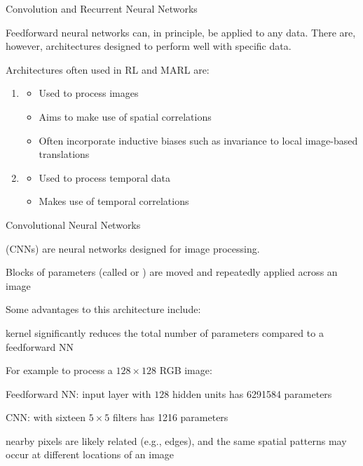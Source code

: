 \begin{frame}[t]{Convolution and Recurrent Neural Networks }

Feedforward neural networks can, in principle, be applied to any data. There are, however, architectures designed to perform well with specific data.

Architectures often used in RL and MARL are:

\begin{enumerate}
    \item {}
    \begin{itemize}
        \item Used to process images
        \item Aims to make use of spatial correlations
        \item Often incorporate inductive biases such as invariance to local image-based translations
    \end{itemize}
        \item {}
    \begin{itemize}
        \item Used to process temporal data 
        \item Makes use of temporal correlations
    \end{itemize}
\end{enumerate}
    
\end{frame}

\begin{frame}[t]{Convolutional Neural Networks}

     (CNNs) are neural networks designed for image processing.
    \blist
        \item Blocks of parameters (called  or ) are moved and repeatedly applied across an image
    \elist

    Some advantages to this architecture include:

    \blist
        \item {} kernel significantly reduces the total number of parameters compared to a feedforward NN
        \item For example to process a $128 \times 128$ RGB image:
            \vspace{5pt}
        \blist
            \item Feedforward NN: input layer with $128$ hidden units has \num{6291584} parameters
            \item CNN: with sixteen $5\times5$ filters has \num{1216} parameters
        \elist
        \item {} nearby pixels are likely related (e.g., edges), and the same spatial patterns may occur at different locations of an image
    \elist

\end{frame}



